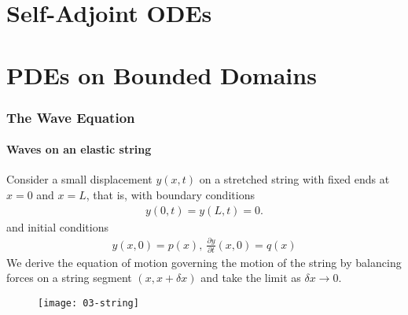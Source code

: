 
\def\npart {IB}
\def\nterm {Michaelmas}
\def\nyear {2022}
\def\nlecturer {Dr E P Shellard}
\def\ncourse {Methods}


\newcommand{\inv}{^{-1}}

\author{Based on lectures by \nlecturer \ and notes by thirdsgames.co.uk}





    \maketitle
    \tableofcontents

    \part{Self-Adjoint ODEs}
    
    
    \part{PDEs on Bounded Domains}
    \section{The Wave Equation}
    \subsection{Waves on an elastic string}
    Consider a small displacement $y(x,t)$ on a stretched string with fixed ends at $x = 0$ and $x = L$, that is, with boundary conditions
    \begin{align} \label{eq:3.1}
        y(0,t) = y(L,t) = 0.
    \end{align} 
    and initial conditions
    \begin{align} \label{eq:3.2}
        y(x, 0) = p(x),\ \frac{\partial y}{\partial t}(x,0) = q(x)
    \end{align} 
    We derive the equation of motion governing the motion of the string by balancing forces on a string segment $(x,x+\delta x)$ and take the limit as $\delta x \to 0$.
    \begin{figure}[h] 
        \centering 
        \texttt{[image: 03-string]} 
    \end{figure}

